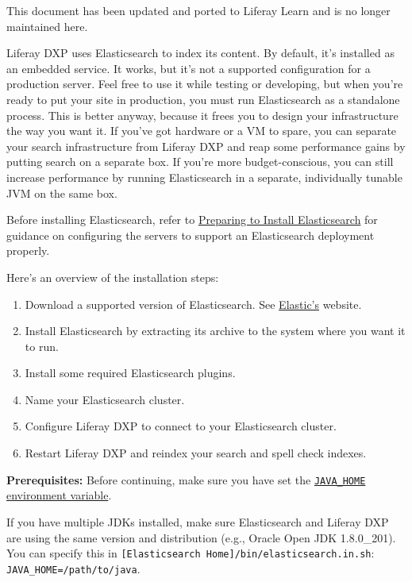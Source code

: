 {This document has been updated and ported to Liferay Learn and is no
longer maintained here.}

Liferay DXP uses Elasticsearch to index its content. By default, it's
installed as an embedded service. It works, but it's not a supported
configuration for a production server. Feel free to use it while testing
or developing, but when you're ready to put your site in production, you
must run Elasticsearch as a standalone process. This is better anyway,
because it frees you to design your infrastructure the way you want it.
If you've got hardware or a VM to spare, you can separate your search
infrastructure from Liferay DXP and reap some performance gains by
putting search on a separate box. If you're more budget-conscious, you
can still increase performance by running Elasticsearch in a separate,
individually tunable JVM on the same box.

Before installing Elasticsearch, refer to
\href{/docs/7-2/deploy/-/knowledge_base/d/preparing-to-install-elasticsearch}{Preparing
to Install Elasticsearch} for guidance on configuring the servers to
support an Elasticsearch deployment properly.

Here's an overview of the installation steps:

\begin{enumerate}
\def\labelenumi{\arabic{enumi}.}
\item
  Download a supported version of Elasticsearch. See
  \href{https://www.elastic.co}{Elastic's} website.
\item
  Install Elasticsearch by extracting its archive to the system where
  you want it to run.
\item
  Install some required Elasticsearch plugins.
\item
  Name your Elasticsearch cluster.
\item
  Configure Liferay DXP to connect to your Elasticsearch cluster.
\item
  Restart Liferay DXP and reindex your search and spell check indexes.
\end{enumerate}

\noindent\hrulefill

\textbf{Prerequisites:} Before continuing, make sure you have set the
\href{https://docs.oracle.com/cd/E19182-01/820-7851/inst_cli_jdk_javahome_t/}{\texttt{JAVA\_HOME}
environment variable}.

If you have multiple JDKs installed, make sure Elasticsearch and Liferay
DXP are using the same version and distribution (e.g., Oracle Open JDK
1.8.0\_201). You can specify this in
\texttt{{[}Elasticsearch\ Home{]}/bin/elasticsearch.in.sh}:
\texttt{JAVA\_HOME=/path/to/java}.

